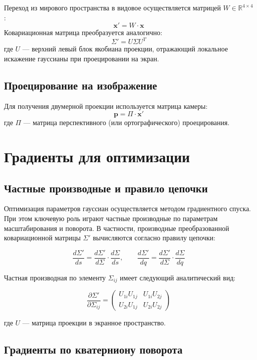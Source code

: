 Переход из мирового пространства в видовое осуществляется матрицей $W \in \mathbb{R}^{4 \times 4}$:
\[
\mathbf{x}' = W \cdot \mathbf{x}
\]
Ковариационная матрица преобразуется аналогично:
\[
\Sigma' = U \Sigma U^T
\]
где $U$ — верхний левый блок якобиана проекции, отражающий локальное искажение гауссианы при проецировании на экран.

\subsection{Проецирование на изображение}

Для получения двумерной проекции используется матрица камеры:
\[
\mathbf{p} = \Pi \cdot \mathbf{x}'
\]
где $\Pi$ — матрица перспективного (или ортографического) проецирования.

\section{Градиенты для оптимизации}

\subsection{Частные производные и правило цепочки}

Оптимизация параметров гауссиан осуществляется методом градиентного спуска. При этом ключевую роль играют частные производные по параметрам масштабирования и поворота. В частности, производные преобразованной ковариационной матрицы $\Sigma'$ вычисляются согласно правилу цепочки:

\[
\frac{d\Sigma'}{ds} = \frac{d\Sigma'}{d\Sigma} \cdot \frac{d\Sigma}{ds}, \qquad
\frac{d\Sigma'}{dq} = \frac{d\Sigma'}{d\Sigma} \cdot \frac{d\Sigma}{dq}
\]

Частная производная по элементу $\Sigma_{ij}$ имеет следующий аналитический вид:

\[
\frac{\partial \Sigma'}{\partial \Sigma_{ij}} =
\begin{pmatrix}
U_{1i} U_{1j} & U_{1i} U_{2j} \\
U_{2i} U_{1j} & U_{2i} U_{2j}
\end{pmatrix}
\]

где $U$ — матрица проекции в экранное пространство.

\subsection{Градиенты по кватерниону поворота}

